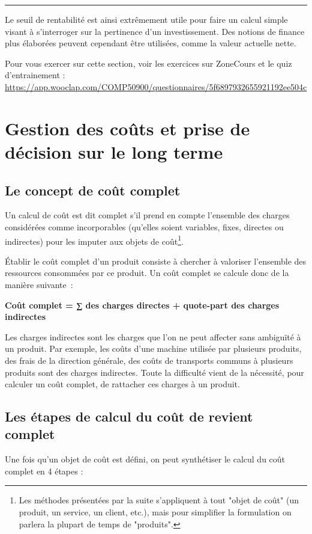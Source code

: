 \documentclass[oneside]{kaobook}
\begin{document}
\noindent\rule{\textwidth}{0.5pt}

Le seuil de rentabilité est ainsi extrêmement utile pour faire un calcul simple visant à s'interroger sur la pertinence d'un investissement. Des notions de finance plus élaborées peuvent cependant être utilisées, comme la valeur actuelle nette.

\begin{kaobox}
Pour vous exercer sur cette section, voir les exercices sur ZoneCours et le quiz d'entrainement : \url{https://app.wooclap.com/COMP50900/questionnaires/5f6897932655921192ee504c}
\end{kaobox}

\chapter{Gestion des coûts et prise de décision sur le long terme}
\label{sec:orga092c47}
\section{Le concept de coût complet}
\label{sec:org7a4be4f}

Un calcul de coût est dit complet s'il prend en compte l'ensemble des charges considérées comme incorporables (qu'elles soient variables, fixes, directes ou indirectes) pour les imputer aux objets de coût\footnote{Les méthodes présentées par la suite s'appliquent à tout "objet de coût" (un produit, un service, un client, etc.), mais pour simplifier la formulation on parlera la plupart de temps de "produits".}. 

Établir le coût complet d'un produit consiste à chercher à valoriser l'ensemble des ressources consommées par ce produit. Un coût complet se calcule donc de la manière suivante :
\begin{center}
\textbf{Coût complet = ∑ des charges directes + quote-part des charges indirectes}
\end{center}
Les charges indirectes sont les charges que l'on ne peut affecter sans ambiguïté à un produit. Par exemple, les coûts d'une machine utilisée par plusieurs produits, des frais de la direction générale, des coûts de transports communs à plusieurs produits sont des charges indirectes. Toute la difficulté vient de la nécessité, pour calculer un coût complet, de rattacher ces charges à un produit.
\section{Les étapes de calcul du coût de revient complet}
\label{sec:orgfb8537c}
Une fois qu'un objet de coût est défini, on peut synthétiser le calcul du coût complet en 4 étapes :
\end{document}
